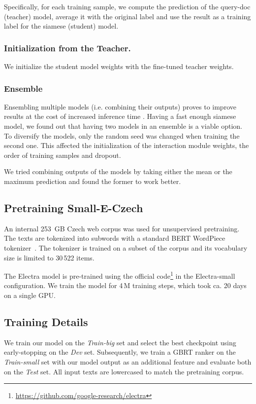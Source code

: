 \documentclass[letterpaper]{article} \usepackage{aaai22 }  \usepackage{times}  \usepackage{helvet}  \usepackage{courier}  \usepackage[hyphens]{url}  \usepackage{graphicx} \usepackage{amsmath,amsfonts,amssymb, mathabx,bm,bbm}
\begin{document}
Specifically, for each training sample, we compute the prediction of the query-doc (teacher) model, average it with the original label and use the result as a training label for the siamese (student) model.

\subsubsection{Initialization from the Teacher.} We initialize the student model weights with the fine-tuned
teacher weights.

\subsubsection{Ensemble}

Ensembling multiple models (i.e. combining their outputs) proves to improve results at the cost of increased inference time \cite{ensemble_ml}. Having a fast enough siamese model, we found out that having two models in an ensemble is a viable option. To diversify the models, only the random seed was changed when training the second one. This affected the initialization of the interaction module weights, the order of training samples and dropout.

We tried combining outputs of the models by taking either the mean or the maximum prediction and found the former to work better.



\subsection{Pretraining Small-E-Czech}
An internal 253~GB Czech web corpus was used for unsupervised pretraining. The texts are tokenized into subwords with a standard BERT WordPiece tokenizer~\cite{schuster2012japanese}. The tokenizer is trained on a subset of the corpus and its vocabulary size is limited to 30\,522 items. 

The Electra model is pre-trained using the official code\footnote{\url{https://github.com/google-research/electra}} in the Electra-small configuration. We train the model for 4\,M training steps, which took ca. 20 days on a single GPU.

\subsection{Training Details}

We train our model on the \textit{Train-big} set and select the best checkpoint using early-stopping on the \textit{Dev} set. Subsequently, we train a GBRT ranker on the \textit{Train-small} set with our model output as an additional feature and evaluate both on the \textit{Test} set. All input texts are lowercased to match the pretraining corpus.
\end{document}
